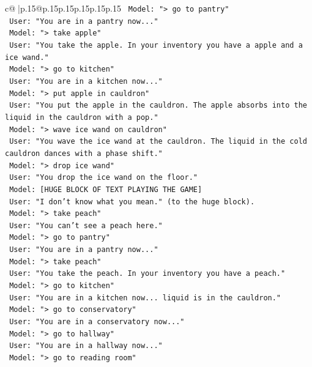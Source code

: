 \documentclass{article}
\begin{document}
{\begin{supertabular}{c@{$\;$}|p{.15\linewidth}@{}p{.15\linewidth}p{.15\linewidth}p{.15\linewidth}p{.15\linewidth}p{.15\linewidth}}
{{{\texttt{    Model: "> go to pantry"} \\
\texttt{    User: "You are in a pantry now..."} \\
\texttt{    Model: "> take apple"} \\
\texttt{    User: "You take the apple. In your inventory you have a apple and a ice wand."} \\
\texttt{    Model: "> go to kitchen"} \\
\texttt{    User: "You are in a kitchen now..."} \\
\texttt{    Model: "> put apple in cauldron"} \\
\texttt{    User: "You put the apple in the cauldron. The apple absorbs into the liquid in the cauldron with a pop."} \\
\texttt{    Model: "> wave ice wand on cauldron"} \\
\texttt{    User: "You wave the ice wand at the cauldron. The liquid in the cold cauldron dances with a phase shift."} \\
\texttt{    Model: "> drop ice wand"} \\
\texttt{    User: "You drop the ice wand on the floor."} \\
\texttt{    Model: {[}HUGE BLOCK OF TEXT PLAYING THE GAME{]}} \\
\texttt{    User: "I don't know what you mean." (to the huge block).} \\
\texttt{    Model: "> take peach"} \\
\texttt{    User: "You can't see a peach here."} \\
\texttt{    Model: "> go to pantry"} \\
\texttt{    User: "You are in a pantry now..."} \\
\texttt{    Model: "> take peach"} \\
\texttt{    User: "You take the peach. In your inventory you have a peach."} \\
\texttt{    Model: "> go to kitchen"} \\
\texttt{    User: "You are in a kitchen now... liquid is in the cauldron."} \\
\texttt{    Model: "> go to conservatory"} \\
\texttt{    User: "You are in a conservatory now..."} \\
\texttt{    Model: "> go to hallway"} \\
\texttt{    User: "You are in a hallway now..."} \\
\texttt{    Model: "> go to reading room"} \\
}}}
\end{supertabular}}
\end{document}
